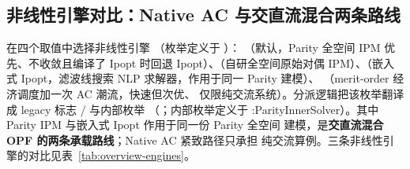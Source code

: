 \subsection{非线性引擎对比：Native AC 与交直流混合两条路线}\label{subsec:overview-engines}

 在四个取值中选择非线性引擎
（枚举定义于
）：
（默认，Parity 全空间 IPM 优先、不收敛且编译了 Ipopt 时回退
Ipopt）、（自研全空间原始对偶 IPM）、（嵌入式
Ipopt，滤波线搜索 NLP 求解器，作用于同一 Parity 建模）、
（merit-order 经济调度加一次 AC 潮流，快速但次优、
仅限纯交流系统）。分派逻辑把该枚举翻译成 legacy 标志
/ 与内部枚举
（；内部枚举定义于
:ParityInnerSolver）。其中 Parity IPM 与嵌入式 Ipopt 作用于同一份 Parity 全空间
建模，是\textbf{交直流混合 OPF 的两条承载路线}；Native AC 紧致路径只承担
纯交流算例。三条非线性引擎的对比见表~\ref{tab:overview-engines}。

